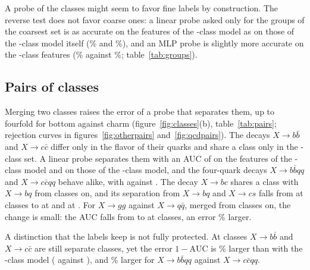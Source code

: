 A probe of the \Kfull{} classes might seem to favor fine labels by construction.
The reverse test does not favor coarse ones: a linear probe asked only for the \Kcoarse{} groups of the coarsest set is
as accurate on the features of the \Kfull-class model as on those of the \Kcoarse-class model itself (\VGroupsLpFull\%
and \VGroupsLpCoarse\%), and an MLP probe is slightly more accurate on the \Kfull-class features (\VGroupsMlpFull\%
against \VGroupsMlpCoarse\%; table~\ref{tab:groups}).

\subsection{Pairs of classes}\label{sec:pairs}

Merging two classes raises the error of a probe that separates them, up to fourfold for bottom against charm
(figure~\ref{fig:classes}(b), table~\ref{tab:pairs}; rejection curves in figures~\ref{fig:otherpairs}
and~\ref{fig:qcdpairs}).
The decays $X\to b\bar b$ and $X\to c\bar c$ differ only in the flavor of their quarks and share a class only in the
\Kcoarse-class set.
A linear probe separates them with an AUC of \VAucBbFull{} on the features of the \Kfull-class model and
\VAucBbCoarse{} on those of the \Kcoarse-class model, and the four-quark decays $X\to b\bar bqq$ and $X\to c\bar cqq$
behave alike, with \VAucBbqqFull{} against \VAucBbqqCoarse.
The decay $X\to bc$ shares a class with $X\to bq$ from \Kmid{} classes on, and its separation from $X\to bq$ and
$X\to cs$ falls from \VAucBcFullThree{} at \Kfull{} classes to \VAucBcMidThree{} at \Kmid{} and \VAucBcCoarseThree{} at
\Kcoarse.
For $X\to gg$ against $X\to q\bar q$, merged from \Kmid{} classes on, the change is small: the AUC falls from
\VAucGgFull{} to \VAucGgCoarse{} at \Kcoarse{} classes, an error \VErrGgCoarsePct\% larger.

A distinction that the labels keep is not fully protected.
At \Kmid{} classes $X\to b\bar b$ and $X\to c\bar c$ are still separate classes, yet the error $1-\mathrm{AUC}$ is
\VErrBbMidPct\% larger than with the \Kfull-class model (\VErrBbMid{} against \VErrBbFull), and \VErrBbqqMidPct\%
larger for $X\to b\bar bqq$ against $X\to c\bar cqq$.


